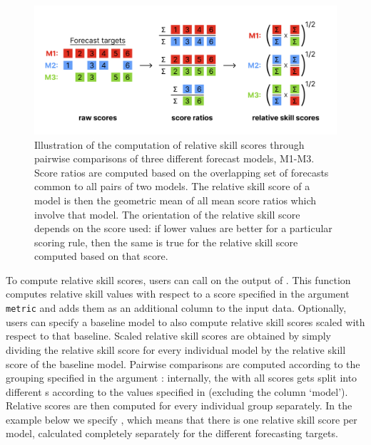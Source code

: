 \documentclass[
]{jss}
\begin{document}
\begin{CodeChunk}
\begin{figure}[!h]

{\centering \includegraphics[width=1\linewidth]{output/pairwise-comparisons} 

}

\caption[Illustration of the computation of relative skill scores through pairwise comparisons of three different forecast models, M1-M3]{Illustration of the computation of relative skill scores through pairwise comparisons of three different forecast models, M1-M3. Score ratios are computed based on the overlapping set of forecasts common to all pairs of two models. The relative skill score of a model is then the geometric mean of all mean score ratios which involve that model. The orientation of the relative skill score depends on the score used: if lower values are better for a particular scoring rule, then the same is true for the relative skill score computed based on that score.}\label{fig:pairwise-comparison}
\end{figure}
\end{CodeChunk}

To compute relative skill scores, users can call
 on the output of . This
function computes relative skill values with respect to a score
specified in the argument \texttt{metric} and adds them as an additional
column to the input data. Optionally, users can specify a baseline model
to also compute relative skill scores scaled with respect to that
baseline. Scaled relative skill scores are obtained by simply dividing
the relative skill score for every individual model by the relative
skill score of the baseline model. Pairwise comparisons are computed
according to the grouping specified in the argument :
internally, the  with all scores gets split into
different s according to the values specified in
 (excluding the column `model'). Relative scores are then
computed for every individual group separately. In the example below we
specify , which means that there is
one relative skill score per model, calculated completely separately for
the different forecasting targets.
\end{document}
